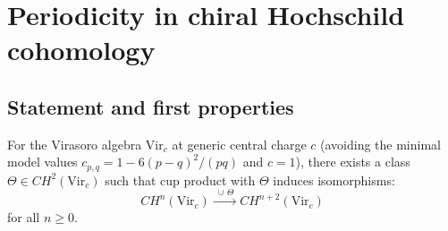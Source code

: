 \section{Periodicity in chiral Hochschild cohomology}

\subsection{Statement and first properties}

\begin{theorem}\label{thm:periodicity-virasoro}
\label{thm:virasoro-periodicity}
For the Virasoro algebra $\mathrm{Vir}_c$ at generic central charge $c$
(avoiding the minimal model values
$c_{p,q} = 1 - 6(p-q)^2/(pq)$ and $c = 1$),
there exists a class $\Theta \in CH^2(\mathrm{Vir}_c)$ such that cup product
with $\Theta$ induces isomorphisms:
\[
CH^n(\mathrm{Vir}_c) \xrightarrow{\;\cup\,\Theta\;}
CH^{n+2}(\mathrm{Vir}_c)
\]
for all $n \geq 0$.
\end{theorem}

